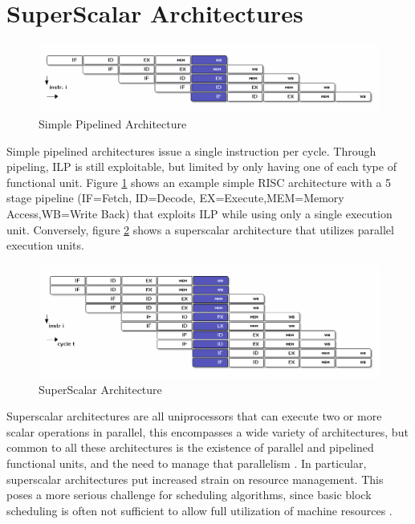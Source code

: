 \documentclass[12pt]{report}
\begin{document}
\section{SuperScalar Architectures}
\label{sec:org4890941}

\begin{figure}[htbp]
\centering
\includegraphics[width=1.0\textwidth]{figures/RISCPipeline.png}
\caption{\label{fig:PipelinedArchitecture}Simple Pipelined Architecture}
\end{figure}


Simple pipelined architectures issue a single instruction per cycle.
Through pipeling, ILP is still exploitable, but limited by only having one of
each type of functional unit. Figure \ref{fig:PipelinedArchitecture} shows an
example simple RISC architecture with a 5 stage pipeline (IF=Fetch,
ID=Decode, EX=Execute,MEM=Memory Access,WB=Write Back) that exploits ILP while using only a single
execution unit. Conversely, figure \ref{fig:SuperScalarArchitecture} shows a
superscalar architecture that utilizes parallel execution units.  

\begin{figure}[htbp]
\centering
\includegraphics[width=1.0\textwidth]{figures/SuperScalarPipeline.png}
\caption{\label{fig:SuperScalarArchitecture}SuperScalar Architecture}
\end{figure}


Superscalar architectures are all uniprocessors that can execute two or more
scalar operations in parallel, this encompasses a wide variety of
architectures, but common to all these architectures is the existence of
parallel and pipelined functional units, and the need to manage that
parallelism \parencite{zyuban2001inherently}. In particular, superscalar
architectures put increased strain on resource management. This poses a more
serious challenge for scheduling algorithms, since basic block scheduling is
often not sufficient to allow full utilization of machine
resources \parencite{bernstein1991global}. 
\end{document}
